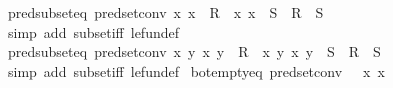 \begin{isabellebody}
\isadelimproof
\isanewline
%
\endisadelimproof
\isanewline
{}\isamarkupfalse%
\ pred{\isacharunderscore}{\kern0pt}subset{\isacharunderscore}{\kern0pt}eq\ {\isacharbrackleft}{\kern0pt}pred{\isacharunderscore}{\kern0pt}set{\isacharunderscore}{\kern0pt}conv{\isacharbrackright}{\kern0pt}{\isacharcolon}{\kern0pt}\ {\isachardoublequoteopen}{\isacharparenleft}{\kern0pt}{\isasymlambda}x{\isachardot}{\kern0pt}\ x\ {\isasymin}\ R{\isacharparenright}{\kern0pt}\ {\isasymle}\ {\isacharparenleft}{\kern0pt}{\isasymlambda}x{\isachardot}{\kern0pt}\ x\ {\isasymin}\ S{\isacharparenright}{\kern0pt}\ {\isasymlongleftrightarrow}\ R\ {\isasymsubseteq}\ S{\isachardoublequoteclose}\isanewline
%
\isadelimproof
\ \ %
\endisadelimproof
%
\isatagproof
{}\isamarkupfalse%
\ {\isacharparenleft}{\kern0pt}simp\ add{\isacharcolon}{\kern0pt}\ subset{\isacharunderscore}{\kern0pt}iff\ le{\isacharunderscore}{\kern0pt}fun{\isacharunderscore}{\kern0pt}def{\isacharparenright}{\kern0pt}%
\endisatagproof
{\isafoldproof}%
%
\isadelimproof
\isanewline
%
\endisadelimproof
\isanewline
{}\isamarkupfalse%
\ pred{\isacharunderscore}{\kern0pt}subset{\isacharunderscore}{\kern0pt}eq{}\ {\isacharbrackleft}{\kern0pt}pred{\isacharunderscore}{\kern0pt}set{\isacharunderscore}{\kern0pt}conv{\isacharbrackright}{\kern0pt}{\isacharcolon}{\kern0pt}\ {\isachardoublequoteopen}{\isacharparenleft}{\kern0pt}{\isasymlambda}x\ y{\isachardot}{\kern0pt}\ {\isacharparenleft}{\kern0pt}x{\isacharcomma}{\kern0pt}\ y{\isacharparenright}{\kern0pt}\ {\isasymin}\ R{\isacharparenright}{\kern0pt}\ {\isasymle}\ {\isacharparenleft}{\kern0pt}{\isasymlambda}x\ y{\isachardot}{\kern0pt}\ {\isacharparenleft}{\kern0pt}x{\isacharcomma}{\kern0pt}\ y{\isacharparenright}{\kern0pt}\ {\isasymin}\ S{\isacharparenright}{\kern0pt}\ {\isasymlongleftrightarrow}\ R\ {\isasymsubseteq}\ S{\isachardoublequoteclose}\isanewline
%
\isadelimproof
\ \ %
\endisadelimproof
%
\isatagproof
{}\isamarkupfalse%
\ {\isacharparenleft}{\kern0pt}simp\ add{\isacharcolon}{\kern0pt}\ subset{\isacharunderscore}{\kern0pt}iff\ le{\isacharunderscore}{\kern0pt}fun{\isacharunderscore}{\kern0pt}def{\isacharparenright}{\kern0pt}%
\endisatagproof
{\isafoldproof}%
%
\isadelimproof
\isanewline
%
\endisadelimproof
\isanewline
{}\isamarkupfalse%
\ bot{\isacharunderscore}{\kern0pt}empty{\isacharunderscore}{\kern0pt}eq\ {\isacharbrackleft}{\kern0pt}pred{\isacharunderscore}{\kern0pt}set{\isacharunderscore}{\kern0pt}conv{\isacharbrackright}{\kern0pt}{\isacharcolon}{\kern0pt}\ {\isachardoublequoteopen}{\isasymbottom}\ {\isacharequal}{\kern0pt}\ {\isacharparenleft}{\kern0pt}{\isasymlambda}x{\isachardot}{\kern0pt}\ x\ {\isasymin}\ {\isacharbraceleft}{\kern0pt}{\isacharbraceright}{\kern0pt}{\isacharparenright}{\kern0pt}{\isachardoublequoteclose}\isanewline

\end{isabellebody}
